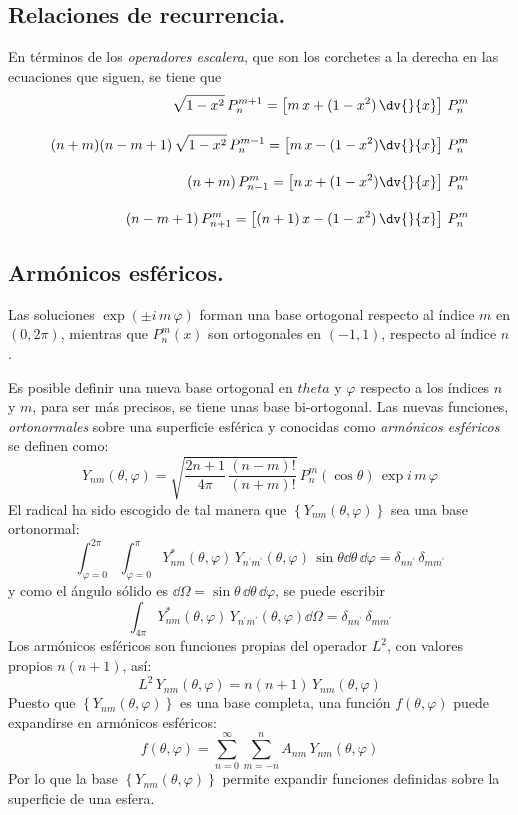 \subsection{Relaciones de recurrencia.}
En términos de los \emph{operadores escalera}, que son los corchetes a la derecha en las ecuaciones que siguen, se tiene que
\begin{align*}
\sqrt{1 - x^{2}} \, P_{n}^{m+1} = \left[ m \, x + (1 - x^{2})\, \dv{}{x} \right] \, P_{n}^{m} \\[1em]
(n + m)(n - m + 1) \, \sqrt{1 - x^{2}} \, P_{n}^{m-1} = \left[ m \, x - (1 - x^{2}) \dv{}{x} \right] \, P_{n}^{m} \\[1em]
(n + m) \, P_{n-1}^{m} = \left[ n \, x + (1 - x^{2}) \dv{}{x} \right] \, P_{n}^{m} \\[1em]
(n -m + 1) \, P_{n+1}^{m} = \left[ (n+1) \, x - (1-x^{2}) \, \dv{}{x} \right] \, P_{n}^{m}
\end{align*}
\subsection{Armónicos esféricos.}
Las soluciones $\exp(\pm i \, m \, \varphi)$ forman una base ortogonal respecto al índice $m$ en $(0, 2 \pi)$, mientras que $P_{n}^{m} (x)$ son ortogonales en $(-1, 1)$, respecto al índice $n$.
\par
Es posible definir una nueva base ortogonal en $theta$ y $\varphi$ respecto a los índices $n$ y $m$, para ser más precisos, se tiene unas base bi-ortogonal. Las nuevas funciones, \emph{ortonormales} sobre una superficie esférica y conocidas como \emph{armónicos esféricos} se definen como:
\[ \boxed{Y_{nm} (\theta, \varphi) = \sqrt{\dfrac{2n+1}{4\pi} \, \dfrac{(n-m)!}{(n+m)!}} \, P_{n}^{m} (\cos \theta) \, \exp{i \, m \, \varphi} } \]
El radical ha sido escogido de tal manera que $\left\{ Y_{nm}(\theta, \varphi) \right\}$ sea una base ortonormal:
\[ \int_{\varphi=0}^{2 \pi} \int_{\varphi=0}^{\pi} Y_{nm}^{*} (\theta, \varphi) \, Y_{n^{\prime}m^{\prime}} (\theta, \varphi) \, \sin \theta \dd \theta \, \dd \varphi = \delta_{n n^{\prime}} \, \delta_{m m^{\prime}}  \]
y como el ángulo sólido es $\dd \Omega = \sin \theta \, \dd \theta \, \dd \varphi$, se puede escribir
\[ \boxed{\int_{4\pi} Y_{nm}^{*} (\theta, \varphi) \, Y_{n^{\prime} m^{\prime}} (\theta, \varphi) \dd \Omega = \delta_{n n^{\prime}} \, \delta_{m m^{\prime}} } \]
Los armónicos esféricos son funciones propias del operador $L^{2}$, con valores propios $n(n+1)$, así:
\[ L^{2} \, Y_{nm} (\theta, \varphi) =  n(n+1) \, Y_{nm}(\theta, \varphi) \]
Puesto que $\left\{ Y_{nm}(\theta, \varphi) \right\}$ es una base completa, una función $f( \theta, \varphi)$ puede expandirse en armónicos esféricos:
\[ f(\theta, \varphi) = \sum_{n=0}^{\infty} \sum_{m=-n}^{n} A_{nm} \, Y_{nm} (\theta, \varphi) \]
Por lo que la base $\left\{ Y_{nm}(\theta, \varphi) \right\}$ permite expandir funciones definidas sobre la superficie de una esfera.

